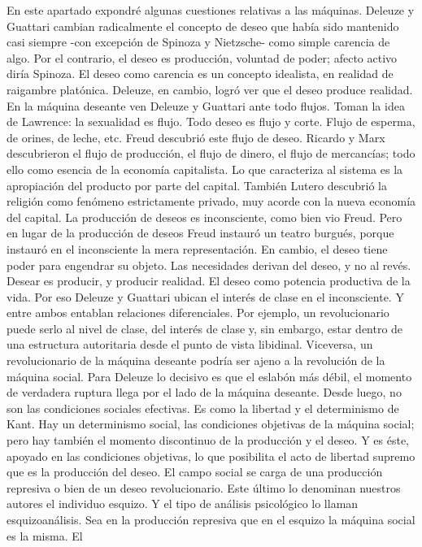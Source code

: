 \documentclass[
]{article}
\begin{document}
En este apartado expondré algunas cuestiones relativas a las máquinas.
Deleuze y Guattari cambian radicalmente el concepto de deseo que había
sido mantenido casi siempre -con excepción de Spinoza y Nietzsche- como
simple carencia de algo. Por el contrario, el deseo es producción,
voluntad de poder; afecto activo diría Spinoza. El deseo como carencia
es un concepto idealista, en realidad de raigambre platónica. Deleuze,
en cambio, logró ver que el deseo produce realidad. En la máquina
deseante ven Deleuze y Guattari ante todo flujos. Toman la idea de
Lawrence: la sexualidad es flujo. Todo deseo es flujo y corte. Flujo de
esperma, de orines, de leche, etc. Freud descubrió este flujo de deseo.
Ricardo y Marx descubrieron el flujo de producción, el flujo de dinero,
el flujo de mercancías; todo ello como esencia de la economía
capitalista. Lo que caracteriza al sistema es la apropiación del
producto por parte del capital. También Lutero descubrió la religión
como fenómeno estrictamente privado, muy acorde con la nueva economía
del capital. La producción de deseos es inconsciente, como bien vio
Freud. Pero en lugar de la producción de deseos Freud instauró un teatro
burgués, porque instauró en el inconsciente la mera representación. En
cambio, el deseo tiene poder para engendrar su objeto. Las necesidades
derivan del deseo, y no al revés. Desear es producir, y producir
realidad. El deseo como potencia productiva de la vida. Por eso Deleuze
y Guattari ubican el interés de clase en el inconsciente. Y entre ambos
entablan relaciones diferenciales. Por ejemplo, un revolucionario puede
serlo al nivel de clase, del interés de clase y, sin embargo, estar
dentro de una estructura autoritaria desde el punto de vista libidinal.
Viceversa, un revolucionario de la máquina deseante podría ser ajeno a
la revolución de la máquina social. Para Deleuze lo decisivo es que el
eslabón más débil, el momento de verdadera ruptura llega por el lado de
la máquina deseante. Desde luego, no son las condiciones sociales
efectivas. Es como la libertad y el determinismo de Kant. Hay un
determinismo social, las condiciones objetivas de la máquina social;
pero hay también el momento discontinuo de la producción y el deseo. Y
es éste, apoyado en las condiciones objetivas, lo que posibilita el acto
de libertad supremo que es la producción del deseo. El campo social se
carga de una producción represiva o bien de un deseo revolucionario.
Este último lo denominan nuestros autores el individuo esquizo. Y el
tipo de análisis psicológico lo llaman esquizoanálisis. Sea en la
producción represiva que en el esquizo la máquina social es la misma. El
\end{document}
